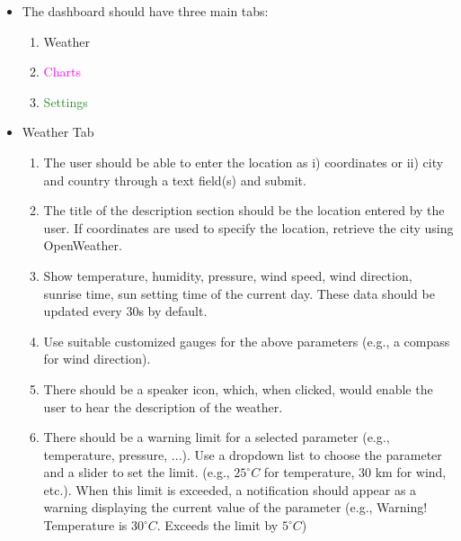 \documentclass[11pt,letterpaper]{article}
\begin{document}
\begin{itemize}
    \item The dashboard should have three main tabs: 
        \begin{enumerate}
            \item \textcolor{NavyBlue}{Weather}
            \item \textcolor{magenta}{Charts}
            \item \textcolor{ForestGreen}{Settings}
        \end{enumerate}
    
    \item \textcolor{NavyBlue}{Weather Tab} 
    
    \begin{enumerate}
        \item The user should be able to enter the location as i) coordinates or ii) city and country through a text field(s) and submit.
        
        \item The title of the description section should be the location entered by the user. If coordinates are used to specify the location, retrieve the city using OpenWeather.
        
         \item Show temperature, humidity, pressure, wind speed, wind direction, sunrise time, sun setting time of the current day. These data should be updated every 30s by default.
         
        \item Use suitable customized gauges for the above parameters (e.g., a compass for wind direction). 
        
        \item There should be a speaker icon, which, when clicked, would enable the user to hear the description of the weather. 
        
        \item There should be a warning limit for a selected parameter (e.g., temperature, pressure, ...). Use a dropdown list to choose the parameter and a slider to set the limit. (e.g., $ 25^\circ C $ for temperature, 30 km for wind, etc.). When this limit is exceeded, a notification should appear as a warning displaying the current value of the parameter (e.g., Warning! Temperature is $ 30^\circ C $. Exceeds the limit by $ 5^\circ C $) 
        
    \end{enumerate}
    

\end{itemize}
\end{document}
